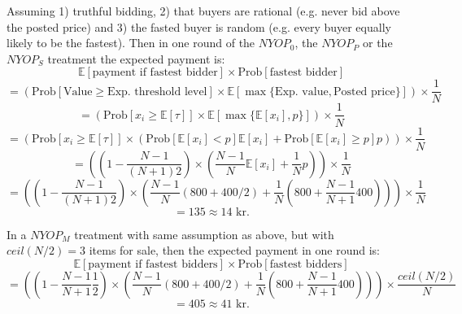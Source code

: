 \documentclass[a4paper,12pt]{article}
\begin{document}
	Assuming 1) truthful bidding, 2) that buyers are rational (e.g. never bid above the posted price) and 3) the fasted buyer is random (e.g. every buyer equally likely to be the fastest). Then in one round of the $NYOP_0$, the $NYOP_P$ or the $NYOP_S$ treatment the expected payment is:
	\[ \mathbb{E}[\mbox{payment if fastest bidder}] \times \mbox{Prob}[\mbox{fastest bidder}] \] 
	\[  = \left( \mbox{Prob}[\mbox{Value} \ge \mbox{Exp. threshold level}] \times \mathbb{E}[\max\{\mbox{Exp. value}, \mbox{Posted price}\}] \right) \times \frac{1}{N} \] 
	\[  = \left( \mbox{Prob}[x_i \ge \mathbb{E}[\tau]] \times \mathbb{E}[\max\{\mathbb{E}[x_i], p\}]  \right) \times \frac{1}{N} \] 
	\[  = \left( \mbox{Prob}[x_i \ge \mathbb{E}[\tau]] \times ( \mbox{Prob}[\mathbb{E}[x_i] < p] \mathbb{E}[x_i] + \mbox{Prob}[\mathbb{E}[x_i] \ge p] p ) \right) \times \frac{1}{N} \] 
	\[  = \left( \left(1-\frac{N-1}{(N+1)2}\right) \times \left( \frac{N-1}{N} \mathbb{E}[x_i] + \frac{1}{N} p \right) \right) \times \frac{1}{N} \] 
	\[  = \left( \left(1-\frac{N-1}{(N+1)2}\right) \times \left( \frac{N-1}{N} (800+400/2) + \frac{1}{N} \left(800+\frac{N-1}{N+1}400\right) \right) \right) \times \frac{1}{N} \] 
	\[	= 135 \approx 14\mbox{ kr.} \]
	
	In a $NYOP_M$ treatment with same assumption as above, but with $ceil(N/2)=3$ items for sale, then the expected payment in one round is:
	\[ \mathbb{E}[\mbox{payment if fastest bidders}] \times \mbox{Prob}[\mbox{fastest bidders}] \] 
	\[  = \left( \left(1-\frac{N-1}{N+1}\frac{1}{2}\right) \times \left( \frac{N-1}{N} (800+400/2) + \frac{1}{N} \left(800+\frac{N-1}{N+1}400\right) \right) \right) \times \frac{ceil(N/2)}{N} \] 
	\[	= 405 \approx 41\mbox{ kr.} \]
	
	
	\newpage
	\tableofcontents
\end{document}
